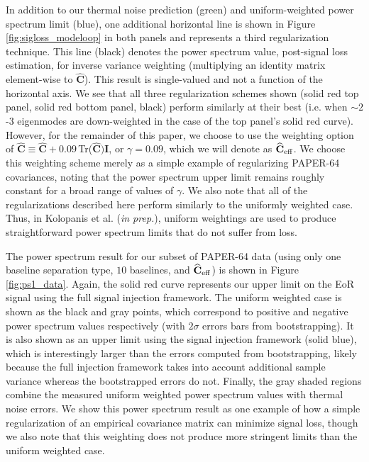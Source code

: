 \documentclass[preprint2,numberedappendix,tighten]{aastex6}  %
\begin{document}
In addition to our thermal noise prediction (green) and uniform-weighted power spectrum limit (blue), one additional horizontal line is shown in Figure \ref{fig:sigloss_modeloop} 
in both panels and represents a third regularization technique. This line (black) denotes the power spectrum value, post-signal loss estimation, for inverse variance weighting (multiplying an identity 
matrix element-wise to $\widehat{\textbf{C}}$). This result is single-valued and not a function of the horizontal axis. We see that all three regularization schemes shown (solid red top panel, solid red bottom panel, black) perform similarly at 
their best (i.e. when $\sim2$-$3$ eigenmodes are down-weighted in the case of the top panel's solid red curve). However, for the remainder of this paper, we choose to use the weighting option of $\widehat{\textbf{C}} \equiv \widehat{\textbf{C}} + 0.09 \,$Tr($\widehat{\textbf{C}})\textbf{I}$, or $\gamma = 0.09$, which we will denote as $\widehat{\textbf{C}}_{\rm eff}$. We choose this weighting scheme merely as a simple example of regularizing PAPER-64 covariances, noting that the power spectrum upper limit remains roughly constant for a broad range of values of $\gamma$. We also note that all of the regularizations described here perform similarly to the uniformly weighted case. Thus, in Kolopanis et al. (\textit{in prep.}), uniform weightings are used to produce straightforward power spectrum limits that do not suffer from loss. 

The power spectrum result for our subset of PAPER-64 data (using only one baseline separation type, $10$ baselines, and $\widehat{\textbf{C}}_{\rm eff}$) is shown in Figure 
\ref{fig:ps1_data}. Again, the solid red curve represents our upper limit on the EoR signal using the full signal injection framework. The uniform weighted case is shown as the black and gray points, which correspond to positive and negative power spectrum values respectively (with 
$2\sigma$ errors bars from bootstrapping). It is also shown as an upper limit using the signal injection framework (solid blue), which is interestingly larger than the errors computed from bootstrapping, likely because the full injection framework takes into account additional sample variance whereas the bootstrapped errors do not. Finally, the gray shaded regions combine the measured uniform weighted power spectrum values with thermal noise errors. We show this power spectrum result as one example of how a simple regularization of an empirical covariance matrix can minimize signal loss, though we also note that this weighting does not produce more stringent limits than the uniform weighted case. 
\end{document}
